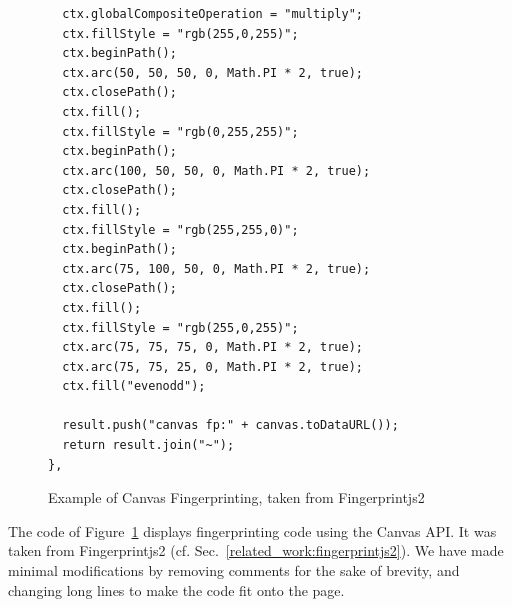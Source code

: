 \documentclass[
    fontsize=12pt,
    headings=small,
    parskip=half,
    bibliography=totoc,
    numbers=noenddot,
    open=any
    ]{scrreprt}
\begin{document}
\begin{appendices}
\begin{figure}
\begin{verbatim}
  ctx.globalCompositeOperation = "multiply";
  ctx.fillStyle = "rgb(255,0,255)";
  ctx.beginPath();
  ctx.arc(50, 50, 50, 0, Math.PI * 2, true);
  ctx.closePath();
  ctx.fill();
  ctx.fillStyle = "rgb(0,255,255)";
  ctx.beginPath();
  ctx.arc(100, 50, 50, 0, Math.PI * 2, true);
  ctx.closePath();
  ctx.fill();
  ctx.fillStyle = "rgb(255,255,0)";
  ctx.beginPath();
  ctx.arc(75, 100, 50, 0, Math.PI * 2, true);
  ctx.closePath();
  ctx.fill();
  ctx.fillStyle = "rgb(255,0,255)";
  ctx.arc(75, 75, 75, 0, Math.PI * 2, true);
  ctx.arc(75, 75, 25, 0, Math.PI * 2, true);
  ctx.fill("evenodd");

  result.push("canvas fp:" + canvas.toDataURL());
  return result.join("~");
},
\end{verbatim}
\caption{Example of Canvas Fingerprinting, taken from Fingerprintjs2}
\label{app:canvas_fp}
\end{figure}

The code of Figure~\ref{app:canvas_fp} displays fingerprinting code
using the Canvas API. It was taken from Fingerprintjs2 (cf. Sec.~\ref{related_work:fingerprintjs2}).
We have made minimal modifications by removing comments for the sake of brevity, and changing
long lines to make the code fit onto the page.



\end{appendices}
\end{document}
